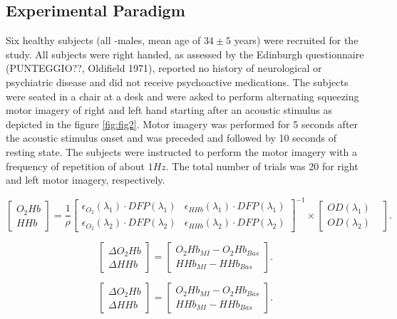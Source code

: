\documentclass[12pt ]{iopart}
\begin{document}
\subsection{Experimental Paradigm}
Six healthy subjects (all -males, mean age of $34 \pm 5$ years) were recruited for the study. All subjects were right handed, as assessed by the Edinburgh questionnaire (PUNTEGGIO??, Oldifield 1971), reported no history of neurological or psychiatric disease and did not receive psychoactive medications. 
The subjects were seated in a chair at a desk and were asked to perform alternating squeezing motor imagery of right and left hand starting after an acoustic stimulus as depicted in the figure \ref{fig:fig2}. Motor imagery was performed for 5 seconds after the acoustic stimulus onset and was preceded and followed by 10 seconds of resting state. The subjects were instructed to perform the motor imagery with a frequency of repetition of about $1Hz$. The total number of trials was 20 for right and left motor imagery, respectively. 



\begin{equation}
	\begin{bmatrix}
		O_2Hb\\
		HHb
	\end{bmatrix}
	=
	\frac{1}{\rho}\begin{bmatrix}
		\epsilon_{O_2}(\lambda_1)\cdot DFP(\lambda_1)&\epsilon_{HHb}(\lambda_1)\cdot DFP(\lambda_1)\\
		\epsilon_{O_2}(\lambda_2)\cdot DFP(\lambda_2)&\epsilon_{HHb}(\lambda_2)\cdot DFP(\lambda_2)
	\end{bmatrix}^{-1}\times
	\begin{bmatrix}
	OD(\lambda_1)&\\
	OD(\lambda_2)
	\end{bmatrix}
	.
\end{equation}


\begin{equation}
\begin{bmatrix}
\Delta O_2Hb\\
\Delta HHb
\end{bmatrix}
=
\begin{bmatrix}
O_2Hb_{MI}-O_2Hb_{Bas}\\
HHb_{MI}-HHb_{Bas}
\end{bmatrix}
.
\end{equation}



\begin{equation}
\begin{bmatrix}
\Delta O_2Hb\\
\Delta HHb
\end{bmatrix}
=
\begin{bmatrix}
O_2Hb_{MI}-O_2Hb_{Bas}\\
HHb_{MI}-HHb_{Bas}
\end{bmatrix}
.
\end{equation}
\end{document}
